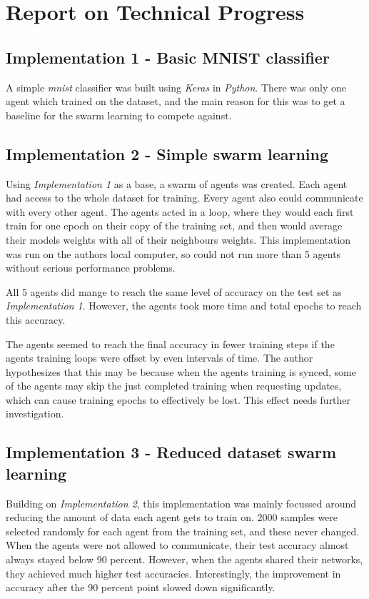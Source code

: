 \chapter{Report on Technical Progress}
\section{Implementation 1 - Basic MNIST classifier}
A simple \emph{mnist} classifier was built using \emph{Keras} in \emph{Python}. There was only one agent which trained on the dataset, and the main reason for this was to get a baseline for the swarm learning to compete against.
\section{Implementation 2 - Simple swarm learning}
Using \emph{Implementation 1} as a base, a swarm of agents was created. Each agent had access to the whole dataset for training. Every agent also could communicate with every other agent. The agents acted in a loop, where they would each first train for one epoch on their copy of the training set, and then would average their models weights with all of their neighbours weights. This implementation was run on the authors local computer, so could not run more than 5 agents without serious performance problems.

All 5 agents did mange to reach the same level of accuracy on the test set as \emph{Implementation 1}. However, the agents took more time and total epochs to reach this accuracy.

The agents seemed to reach the final accuracy in fewer training steps if the agents training loops were offset by even intervals of time. The author hypothesizes that this may be because when the agents training is synced, some of the agents may skip the just completed training when requesting updates, which can cause training epochs to effectively be lost. This effect needs further investigation.
\section{Implementation 3 - Reduced dataset swarm learning}
Building on \emph{Implementation 2}, this implementation was mainly focussed around reducing the amount of data each agent gets to train on. 2000 samples were selected randomly for each agent from the training set, and these never changed. When the agents were not allowed to communicate, their test accuracy almost always stayed below 90 percent. However, when the agents shared their networks, they achieved much higher test accuracies. Interestingly, the improvement in accuracy after the 90 percent point slowed down significantly.

